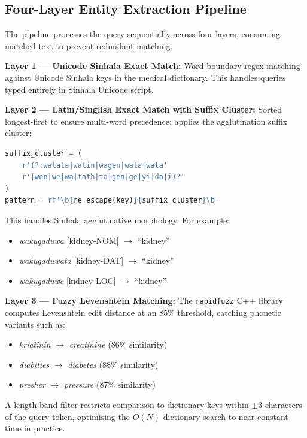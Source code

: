 \documentclass[12pt,a4paper]{report}
\begin{document}
\subsection{Four-Layer Entity Extraction Pipeline}

The pipeline processes the query sequentially across four layers, consuming matched text to prevent redundant matching.

\textbf{Layer 1 --- Unicode Sinhala Exact Match:} Word-boundary regex matching against Unicode Sinhala keys in the medical dictionary. This handles queries typed entirely in Sinhala Unicode script.

\textbf{Layer 2 --- Latin/Singlish Exact Match with Suffix Cluster:} Sorted longest-first to ensure multi-word precedence; applies the agglutination suffix cluster:

\begin{lstlisting}[language=Python, caption={Sinhala agglutination suffix stripping regex}, label={lst:sinhala_suffix}]
suffix_cluster = (
    r'(?:walata|walin|wagen|wala|wata'
    r'|wen|we|wa|tath|ta|gen|ge|yi|da|i)?'
)
pattern = rf'\b{re.escape(key)}{suffix_cluster}\b'
\end{lstlisting}

This handles Sinhala agglutinative morphology. For example:
\begin{itemize}
  \item \textit{wakugaduwa} [kidney-NOM] $\to$ ``kidney''
  \item \textit{wakugaduwata} [kidney-DAT] $\to$ ``kidney''
  \item \textit{wakugaduwe} [kidney-LOC] $\to$ ``kidney''
\end{itemize}

\textbf{Layer 3 --- Fuzzy Levenshtein Matching:} The \texttt{rapidfuzz} C++ library computes Levenshtein edit distance at an 85\% threshold, catching phonetic variants such as:
\begin{itemize}
  \item \textit{kriatinin} $\to$ \textit{creatinine} (86\% similarity)
  \item \textit{diabities} $\to$ \textit{diabetes} (88\% similarity)
  \item \textit{presher} $\to$ \textit{pressure} (87\% similarity)
\end{itemize}

A length-band filter restricts comparison to dictionary keys within $\pm$3 characters of the query token, optimising the $O(N)$ dictionary search to near-constant time in practice.
\end{document}
